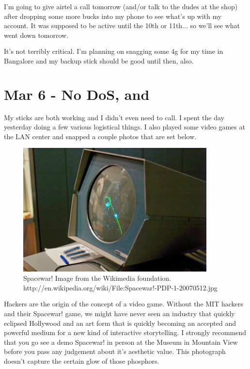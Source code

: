\documentclass[11pt]{amsart}
\begin{document}
I'm going to give airtel a call tomorrow (and/or talk to the dudes at the shop) after dropping some more bucks into my phone to see what's up with my account. It was supposed to be active until the 10th or 11th...  so we'll see what went down tomorrow.

It's not terribly critical. I'm planning on snagging some 4g for my time in Bangalore and my backup stick should be good until then, also.

\newpage

\section{Mar 6 - No DoS, and }

My sticks are both working and I didn't even need to call. I spent the day yesterday doing a few various logistical things. I also played some video games at the LAN center and snapped a couple photos that are set below.

\begin{figure}[ht!]
\center
\includegraphics[width=100mm]{Spacewar!.jpg}
\caption{Spacewar! Image from the Wikimedia foundation. http://en.wikipedia.org/wiki/File:Spacewar!-PDP-1-20070512.jpg}
\end{figure}

Hackers are the origin of the concept of a video game. Without the MIT hackers and their Spacewar! game, we might have never seen an industry that quickly eclipsed Hollywood and an art form that is quickly becoming an accepted and powerful medium for a new kind of interactive storytelling.  I strongly recommend that you go see a demo Spacewar! in person at the Museum in Mountain View before you pass any judgement about it's aesthetic value. This photograph doesn't capture the certain glow of those phosphors.
\end{document}
